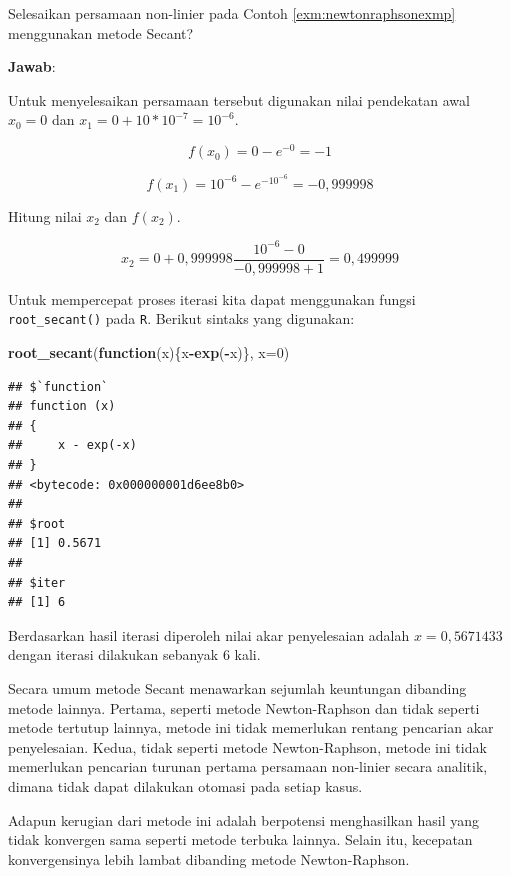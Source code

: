 \documentclass[]{book}
\newenvironment{Shaded}{\begin{snugshade}}{\end{snugshade}}
\newcommand{\ControlFlowTok}[1]{\textcolor[rgb]{0.13,0.29,0.53}{\textbf{#1}}}
\newcommand{\DataTypeTok}[1]{\textcolor[rgb]{0.13,0.29,0.53}{#1}}
\newcommand{\DecValTok}[1]{\textcolor[rgb]{0.00,0.00,0.81}{#1}}
\newcommand{\KeywordTok}[1]{\textcolor[rgb]{0.13,0.29,0.53}{\textbf{#1}}}
\newcommand{\NormalTok}[1]{#1}
\newcommand{\OperatorTok}[1]{\textcolor[rgb]{0.81,0.36,0.00}{\textbf{#1}}}
\theoremstyle{definition}
\theoremstyle{definition}
\theoremstyle{definition}
\theoremstyle{remark}
\let\BeginKnitrBlock\begin \let\EndKnitrBlock\end
\begin{document}
\BeginKnitrBlock{example}
\protect\hypertarget{exm:secantexmp}{}{\label{exm:secantexmp} }Selesaikan persamaan non-linier pada Contoh \ref{exm:newtonraphsonexmp} menggunakan metode Secant?
\EndKnitrBlock{example}

\textbf{Jawab}:

Untuk menyelesaikan persamaan tersebut digunakan nilai pendekatan awal \(x_0=0\) dan \(x_1=0+10*10^{-7}=10^{-6}\).

\[
f\left(x_0 \right)=0-e^{-0}=-1
\]

\[
f\left(x_1 \right)=10^{-6}-e^{-10^{-6}}=-0,999998
\]

Hitung nilai \(x_2\) dan \(f\left(x_2 \right)\).

\[
x_2=0+0,999998\frac{10^{-6}-0}{-0,999998+1}=0,499999
\]

Untuk mempercepat proses iterasi kita dapat menggunakan fungsi \texttt{root\_secant()} pada \texttt{R}. Berikut sintaks yang digunakan:

\begin{Shaded}
\begin{Highlighting}[]
\KeywordTok{root_secant}\NormalTok{(}\ControlFlowTok{function}\NormalTok{(x)\{x}\OperatorTok{-}\KeywordTok{exp}\NormalTok{(}\OperatorTok{-}\NormalTok{x)\}, }\DataTypeTok{x=}\DecValTok{0}\NormalTok{)}
\end{Highlighting}
\end{Shaded}

\begin{verbatim}
## $`function`
## function (x) 
## {
##     x - exp(-x)
## }
## <bytecode: 0x000000001d6ee8b0>
## 
## $root
## [1] 0.5671
## 
## $iter
## [1] 6
\end{verbatim}

Berdasarkan hasil iterasi diperoleh nilai akar penyelesaian adalah \(x=0,5671433\) dengan iterasi dilakukan sebanyak \(6\) kali.

Secara umum metode Secant menawarkan sejumlah keuntungan dibanding metode lainnya. Pertama, seperti metode Newton-Raphson dan tidak seperti metode tertutup lainnya, metode ini tidak memerlukan rentang pencarian akar penyelesaian. Kedua, tidak seperti metode Newton-Raphson, metode ini tidak memerlukan pencarian turunan pertama persamaan non-linier secara analitik, dimana tidak dapat dilakukan otomasi pada setiap kasus.

Adapun kerugian dari metode ini adalah berpotensi menghasilkan hasil yang tidak konvergen sama seperti metode terbuka lainnya. Selain itu, kecepatan konvergensinya lebih lambat dibanding metode Newton-Raphson.
\end{document}
